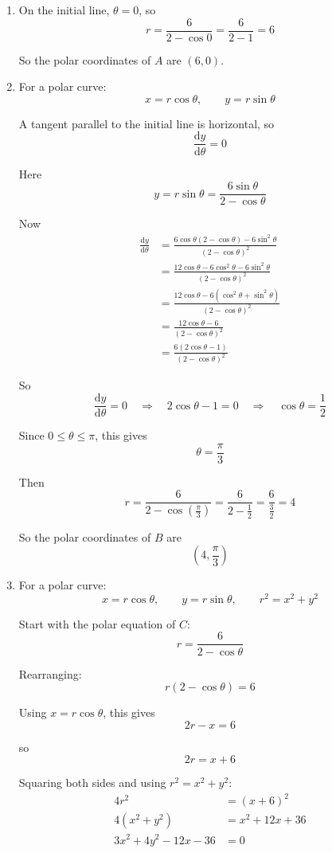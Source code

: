 \documentclass[leqno]{article}
\begin{document}
\begin{enumerate}[
  label=\textbf{\arabic*.},
  leftmargin=*,
  topsep=0pt,
  partopsep=0pt,
  parsep=0pt
]
\vspace*{10pt}

\begin{djsSolution}
\begin{enumerate}[label=\textbf{(\alph*)}]
\item On the initial line, \(\theta=0\), so
\[
r=\frac{6}{2-\cos 0}=\frac{6}{2-1}=6
\]

So the polar coordinates of \(A\) are \((6,0)\).

\item For a polar curve:
\[
x=r\cos\theta,\qquad y=r\sin\theta
\]

A tangent parallel to the initial line is horizontal, so
\[
\frac{\mathrm{d}y}{\mathrm{d}\theta}=0
\]

Here
\[
y=r\sin\theta=\frac{6\sin\theta}{2-\cos\theta}
\]

Now
\begin{align*}
\frac{\mathrm{d}y}{\mathrm{d}\theta}
&=
\frac{6\cos\theta(2-\cos\theta)-6\sin^2\theta}{(2-\cos\theta)^2} \\
&=
\frac{12\cos\theta-6\cos^2\theta-6\sin^2\theta}{(2-\cos\theta)^2} \\
&=
\frac{12\cos\theta-6(\cos^2\theta+\sin^2\theta)}{(2-\cos\theta)^2} \\
&=
\frac{12\cos\theta-6}{(2-\cos\theta)^2} \\
&=
\frac{6(2\cos\theta-1)}{(2-\cos\theta)^2}
\end{align*}

So
\[
\frac{\mathrm{d}y}{\mathrm{d}\theta}=0
\quad\Longrightarrow\quad
2\cos\theta-1=0
\quad\Longrightarrow\quad
\cos\theta=\frac12
\]

Since \(0\leq \theta\leq \pi\), this gives
\[
\theta=\frac{\pi}{3}
\]

Then
\[
r=\frac{6}{2-\cos\left(\frac{\pi}{3}\right)}
=
\frac{6}{2-\frac12}
=
\frac{6}{\frac32}
=4
\]

So the polar coordinates of \(B\) are
\[
\left(4,\frac{\pi}{3}\right)
\]

\item For a polar curve:
\[
x=r\cos\theta,\qquad y=r\sin\theta,\qquad r^2=x^2+y^2
\]

Start with the polar equation of \(C\):
\[
r=\frac{6}{2-\cos\theta}
\]

Rearranging:
\[
r(2-\cos\theta)=6
\]

Using \(x=r\cos\theta\), this gives
\[
2r-x=6
\]

so
\[
2r=x+6
\]

Squaring both sides and using \(r^2=x^2+y^2\):
\begin{align*}
4r^2&=(x+6)^2 \\
4(x^2+y^2)&=x^2+12x+36 \\
3x^2+4y^2-12x-36&=0
\end{align*}


\end{enumerate}
\end{djsSolution}
\end{enumerate}
\end{document}
